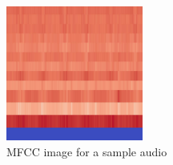       \begin{figure}[h!]
            \centering
            \includegraphics[width=0.4\textwidth]{images/koel_mfcc.jpg}
            \caption{MFCC image for a sample audio}
            \label{fig:mfcc_sample}
      \end{figure}
      


